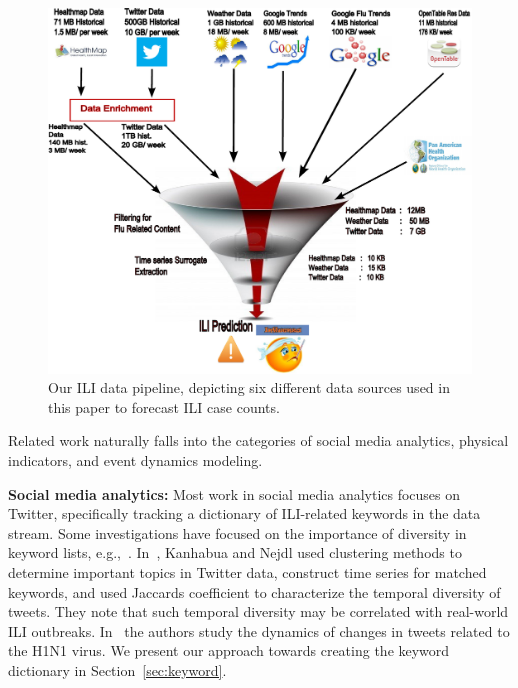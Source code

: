 
\begin{figure}[t] \centering
    \includegraphics[width=0.95\columnwidth]{fig/ili_data_pipeline.pdf}
    \caption{\label{fig:ili_data_pipeline} Our ILI data pipeline, depicting 
six different data sources used in this paper to forecast ILI case counts.}
 \end{figure}

Related work naturally falls into the categories of social media
analytics, physical indicators, and event dynamics modeling. 
 
\textbf{Social media analytics:}
Most work in social media analytics focuses on Twitter, specifically tracking
a dictionary of ILI-related keywords in the data stream.
Some investigations have focused on the importance of diversity in keyword 
lists, e.g.,~\cite{ref5, ref6}. In~\cite{ref5}, 
Kanhabua and Nejdl used clustering methods to determine
important topics in Twitter data, construct time series for matched keywords,
and used Jaccards coefficient to characterize the temporal
diversity of tweets. They note that such temporal diversity may be
correlated with real-world ILI outbreaks. In~\cite{ref6}
the authors study the dynamics of changes in tweets related to the H1N1 virus. We 
present our approach towards creating the keyword dictionary in Section~\ref{sec:keyword}.

